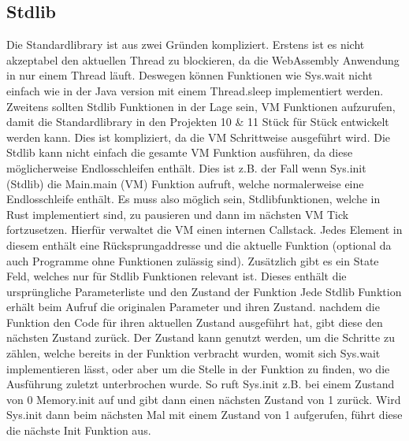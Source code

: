 \subsection{Stdlib}
Die Standardlibrary ist aus zwei Gründen kompliziert. Erstens ist es nicht akzeptabel den aktuellen Thread zu blockieren, da die WebAssembly Anwendung in nur einem Thread läuft. Deswegen können Funktionen wie Sys.wait nicht einfach wie in der Java version mit einem Thread.sleep implementiert werden.
Zweitens sollten Stdlib Funktionen in der Lage sein, VM Funktionen aufzurufen, damit die Standardlibrary in den Projekten 10 & 11 Stück für Stück entwickelt werden kann. Dies ist kompliziert, da die VM Schrittweise ausgeführt wird. Die Stdlib kann nicht einfach die gesamte VM Funktion ausführen, da diese möglicherweise Endlosschleifen enthält. Dies ist z.B. der Fall wenn Sys.init (Stdlib) die Main.main (VM) Funktion aufruft, welche normalerweise eine Endlosschleife enthält.
Es muss also möglich sein, Stdlibfunktionen, welche in Rust implementiert sind, zu pausieren und dann im nächsten VM Tick fortzusetzen.
Hierfür verwaltet die VM einen internen Callstack. Jedes Element in diesem enthält eine Rücksprungaddresse und die aktuelle Funktion (optional da auch Programme ohne Funktionen zulässig sind).
Zusätzlich gibt es ein State Feld, welches nur für Stdlib Funktionen relevant ist. Dieses enthält die ursprüngliche Parameterliste und den Zustand der Funktion
Jede Stdlib Funktion erhält beim Aufruf die originalen Parameter und ihren Zustand.
nachdem die Funktion den Code für ihren aktuellen Zustand ausgeführt hat, gibt diese den nächsten Zustand zurück.
Der Zustand kann genutzt werden, um die Schritte zu zählen, welche bereits in der Funktion verbracht wurden, womit sich Sys.wait implementieren lässt, oder aber um die Stelle in der Funktion zu finden, wo die Ausführung zuletzt unterbrochen wurde. So ruft Sys.init z.B. bei einem Zustand von 0 Memory.init auf und gibt dann einen nächsten Zustand von 1 zurück. Wird Sys.init dann beim nächsten Mal mit einem Zustand von 1 aufgerufen, führt diese die nächste Init Funktion aus.
